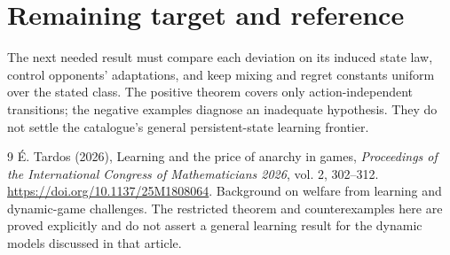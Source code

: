 \documentclass[11pt,a4paper]{article}
\theoremstyle{definition}
\theoremstyle{remark}
\begin{document}
\section{Remaining target and reference}
The next needed result must compare each deviation on its induced state law, control opponents' adaptations, and keep mixing and regret constants uniform over the stated class. The positive theorem covers only action-independent transitions; the negative examples diagnose an inadequate hypothesis. They do not settle the catalogue's general persistent-state learning frontier.
\begin{thebibliography}{9}
 \'E. Tardos (2026), Learning and the price of anarchy in games, \emph{Proceedings of the International Congress of Mathematicians 2026}, vol. 2, 302--312. \url{https://doi.org/10.1137/25M1808064}. Background on welfare from learning and dynamic-game challenges. The restricted theorem and counterexamples here are proved explicitly and do not assert a general learning result for the dynamic models discussed in that article.
\end{thebibliography}
\end{document}

